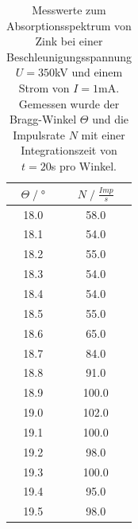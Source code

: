 \begin{table}[H]
    \centering
    \begin{tabular}{c c}
        \toprule
        $\Theta\;/\;°$& $N\;/\;\frac{Imp}{s}$\\
        \midrule
        18.0&    58.0\\
        18.1&    54.0\\
        18.2&    55.0\\
        18.3&    54.0\\
        18.4&    54.0\\
        18.5&    55.0\\
        18.6&    65.0\\
        18.7&    84.0\\
        18.8&    91.0\\
        18.9&    100.0\\
        19.0&    102.0\\
        19.1&    100.0\\
        19.2&    98.0\\
        19.3&   100.0\\
        19.4&    95.0\\
        19.5&    98.0\\
        \bottomrule
    \end{tabular}
    \caption{Messwerte zum Absorptionsspektrum von Zink bei einer Beschleunigungsspannung 
    $U=350$kV und einem Strom von $I=1$mA.\\
    Gemessen wurde der Bragg-Winkel $\Theta$ und die Impulsrate $N$ mit einer Integrationszeit
    von $t=20$s pro Winkel.}
\end{table}
